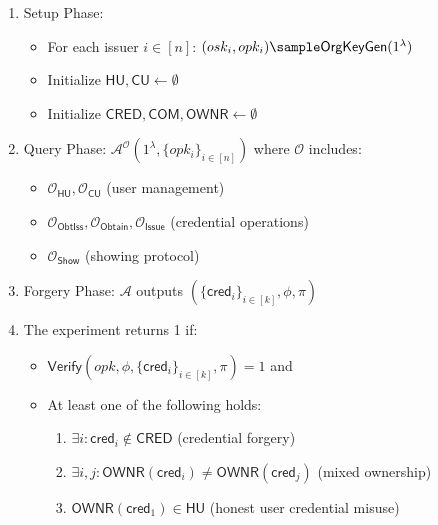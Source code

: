 \begin{enumerate}
    \item Setup Phase:
    \begin{itemize}
        \item For each issuer $i \in [n]$: $(osk_i, opk_i) \sample \mathsf{OrgKeyGen}(1^\lambda)$
        \item Initialize $\mathsf{HU, CU} \gets \emptyset$
        \item Initialize $\mathsf{CRED, COM, OWNR} \gets \emptyset$
    \end{itemize}

    \item Query Phase: $\mathcal{A}^{\mathcal{O}}(1^\lambda, \{opk_i\}_{i \in [n]})$ where $\mathcal{O}$ includes:
    \begin{itemize}
        \item $\mathcal{O}_{\mathsf{HU}}, \mathcal{O}_{\mathsf{CU}}$ (user management)
        \item $\mathcal{O}_{\mathsf{ObtIss}}, \mathcal{O}_{\mathsf{Obtain}}, \mathcal{O}_{\mathsf{Issue}}$ (credential operations)
        \item $\mathcal{O}_{\mathsf{Show}}$ (showing protocol)
    \end{itemize}

    \item Forgery Phase: $\mathcal{A}$ outputs $(\{\mathsf{cred}_i\}_{i \in [k]}, \phi, \pi)$

    \item The experiment returns 1 if:
    \begin{itemize}
        \item $\mathsf{Verify}(opk, \phi, \{\mathsf{cred}_i\}_{i \in [k]}, \pi) = 1$ and
        \item At least one of the following holds:
            \begin{enumerate}
                \item $\exists i: \mathsf{cred}_i \notin \mathsf{CRED}$ (credential forgery)
                \item $\exists i,j: \mathsf{OWNR}(\mathsf{cred}_i) \neq \mathsf{OWNR}(\mathsf{cred}_j)$ (mixed ownership)
                \item $\mathsf{OWNR}(\mathsf{cred}_1) \in \mathsf{HU}$ (honest user credential misuse)
            \end{enumerate}
    \end{itemize}
\end{enumerate}


